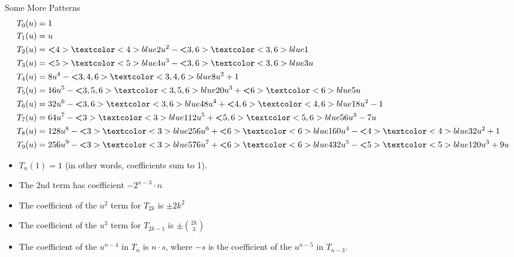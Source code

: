 \documentclass{beamer}
\begin{document}
\begin{frame}{Some More Patterns}
 \vspace{-18pt}
 \tiny{}
 \begin{align*}
  T_0(u) & = 1                                                                                                                                            \\
  T_1(u) & = u                                                                                                                                            \\
  T_2(u) & = \textbf<4>{\textcolor<4>{blue}{2}} u^2 - \textbf<3,6>{\textcolor<3,6>{blue}{1}}                                                              \\
  T_3(u) & = \textbf<5>{\textcolor<5>{blue}{4}} u^3 - \textbf<3,6>{\textcolor<3,6>{blue}{3}} u                                                            \\
  T_4(u) & = 8u^4 - \textbf<3,4,6>{\textcolor<3,4,6>{blue}{8}} u^2 + 1                                                                                    \\
  T_5(u) & = 16u^5 - \textbf<3,5,6>{\textcolor<3,5,6>{blue}{20}} u^3 + \textbf<6>{\textcolor<6>{blue}{5}}u                                                \\
  T_6(u) & = 32u^6 - \textbf<3,6>{\textcolor<3,6>{blue}{48}} u^4 + \textbf<4,6>{\textcolor<4,6>{blue}{18}} u^2 - 1                                        \\
  T_7(u) & = 64u^7 - \textbf<3>{\textcolor<3>{blue}{112}} u^5 + \textbf<5,6>{\textcolor<5,6>{blue}{56}}u^3 - 7u                                           \\
  T_8(u) & = 128u^8 - \textbf<3>{\textcolor<3>{blue}{256}} u^6 + \textbf<6>{\textcolor<6>{blue}{160}} u^4 - \textbf<4>{\textcolor<4>{blue}{32}} u^2 + 1   \\
  T_9(u) & = 256u^9 - \textbf<3>{\textcolor<3>{blue}{576}} u^7 + \textbf<6>{\textcolor<6>{blue}{432}} u^5 - \textbf<5>{\textcolor<5>{blue}{120}} u^3 + 9u
 \end{align*} \normalsize
 \vspace{-15pt}
 \hline
 \begin{itemize}
  \pause
  \item $T_n(1)=1$ (in other words, coefficients sum to 1). \pause
  \item The 2nd term has coefficient $-2^{n-3}\cdot n$ \pause
  \item The coefficient of the $u^2$ term for $T_{2k}$ is $\pm 2k^2$ \pause
  \item The coefficient of the $u^3$ term for $T_{2k-1}$ is $\pm \binom{2k}{3}$ \pause
  \item The coefficient of the $u^{n-4}$ in $T_n$ is $n\cdot s$, where $-s$ is the coefficient of the $u^{n-5}$ in $T_{n-3}$.
 \end{itemize}
\end{frame}
\end{document}
